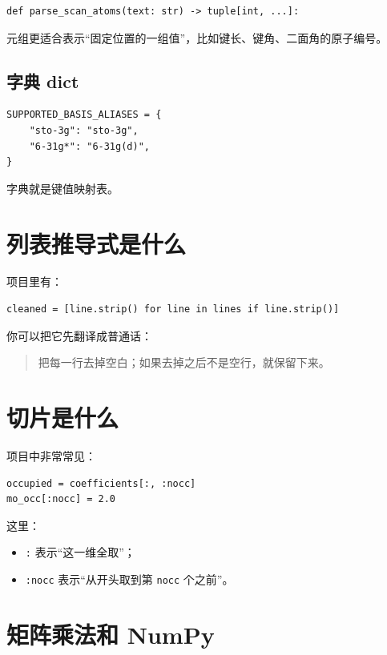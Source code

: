 \documentclass[UTF8,11pt,fontset=fandol]{ctexbook}
\begin{document}
\begin{lstlisting}[style=pythonstyle]
def parse_scan_atoms(text: str) -> tuple[int, ...]:
\end{lstlisting}

元组更适合表示“固定位置的一组值”，比如键长、键角、二面角的原子编号。

\subsection*{字典 dict}

\begin{lstlisting}[style=pythonstyle]
SUPPORTED_BASIS_ALIASES = {
    "sto-3g": "sto-3g",
    "6-31g*": "6-31g(d)",
}
\end{lstlisting}

字典就是键值映射表。

\section{列表推导式是什么}

项目里有：
\begin{lstlisting}[style=pythonstyle]
cleaned = [line.strip() for line in lines if line.strip()]
\end{lstlisting}

你可以把它先翻译成普通话：

\begin{quote}
把每一行去掉空白；如果去掉之后不是空行，就保留下来。
\end{quote}

\section{切片是什么}

项目中非常常见：
\begin{lstlisting}[style=pythonstyle]
occupied = coefficients[:, :nocc]
mo_occ[:nocc] = 2.0
\end{lstlisting}

这里：
\begin{itemize}
  \item \texttt{:} 表示“这一维全取”；
  \item \texttt{:nocc} 表示“从开头取到第 \texttt{nocc} 个之前”。
\end{itemize}

\section{矩阵乘法和 NumPy}
\end{document}
